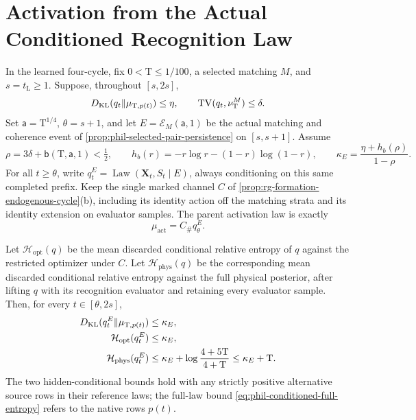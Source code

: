 \section{Activation from the Actual Conditioned Recognition Law}
\label{sec:phil-actual-conditioned-parent}

In the learned four-cycle, fix \(0<\mathrm T\le1/100\), a selected
matching \(M\), and \(s=t_{\mathrm L}\ge1\). Suppose, throughout
\([s,2s]\),
\[
 D_{\mathrm{KL}}(q_t\Vert\mu_{\mathrm T,p(t)})\le\eta,
 \qquad
 \operatorname{TV}(q_t,\nu_{\mathrm T}^M)\le\delta.
\]
Set \(\mathsf a=\mathrm T^{1/4}\), \(\theta=s+1\), and let
\(E=\mathscr E_M(\mathsf a,1)\) be the actual matching and coherence
event of \cref{prop:phil-selected-pair-persistence} on \([s,s+1]\).
Assume
\[
 \rho=3\delta+\mathsf b(\mathrm T,\mathsf a,1)<\tfrac12,
 \qquad
 h_b(r)=-r\log r-(1-r)\log(1-r),
 \qquad
 \kappa_E=\frac{\eta+h_b(\rho)}{1-\rho}.
\]
For all \(t\ge\theta\), write
\(q_t^E=\operatorname{Law}(\mathbf X_t,S_t\mid E)\), always
conditioning on this same completed prefix. Keep the single marked
channel \(C\) of \cref{prop:rg-formation-endogenous-cycle}(b), including
its identity action off the matching strata and its identity extension
on evaluator samples. The parent activation law is exactly
\[
 \mu_{\mathrm{act}}=C_\#q_\theta^E.
\]

Let \(\mathcal H_{\mathrm{opt}}(q)\) be the mean discarded conditional
relative entropy of \(q\) against the restricted optimizer under \(C\).
Let \(\mathcal H_{\mathrm{phys}}(q)\) be the corresponding mean
discarded conditional relative entropy against the full physical
posterior, after lifting \(q\) with its recognition evaluator and
retaining every evaluator sample. Then, for every \(t\in[\theta,2s]\),
\begin{align}
 D_{\mathrm{KL}}(q_t^E\Vert\mu_{\mathrm T,p(t)})&\le\kappa_E,
 \label{eq:phil-conditioned-full-entropy}\\
 \mathcal H_{\mathrm{opt}}(q_t^E)&\le\kappa_E,
 \label{eq:phil-conditioned-opt-entropy}\\
 \mathcal H_{\mathrm{phys}}(q_t^E)
 &\le\kappa_E+\log\frac{4+5\mathrm T}{4+\mathrm T}
 \le\kappa_E+\mathrm T.
 \label{eq:phil-conditioned-physical-entropy}
\end{align}
The two hidden-conditional bounds hold with any strictly positive
alternative source rows in their reference laws; the full-law bound
\cref{eq:phil-conditioned-full-entropy} refers to the native rows
\(p(t)\).

